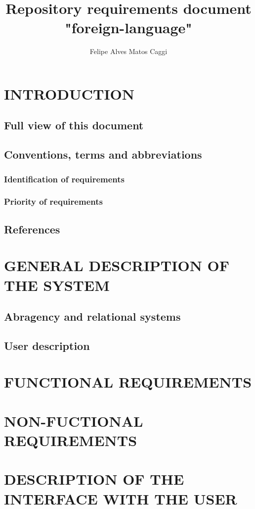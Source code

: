 \documentclass[11pt, twoside, a4paper]{book}
\begin{document}
	\title{Repository requirements document "foreign-language"}
	\author{Felipe Alves Matos Caggi}
	\maketitle
	
	\tableofcontents
	\newpage
	
	\chapter{INTRODUCTION}
	
		\section{Full view of this document}
		\section{Conventions, terms and abbreviations}
			\subsection{Identification of requirements}
			\subsection{Priority of requirements}
		\section{References}
		
	\chapter{GENERAL DESCRIPTION OF THE SYSTEM}
		
		\section{Abragency and relational systems}
		\section{User description}
	
	\chapter{FUNCTIONAL REQUIREMENTS}
		
	\chapter{NON-FUCTIONAL REQUIREMENTS}
	
	\chapter{DESCRIPTION OF THE INTERFACE WITH THE USER}
\end{document}

